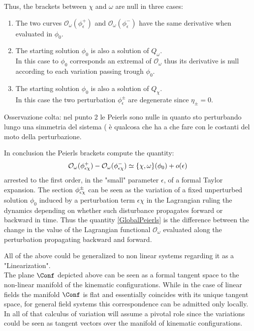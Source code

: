 \documentclass[Main]{subfiles}
\begin{document}
		Thus, the brackets between $\chi$ and $\omega$ are null in three cases:
		\begin{enumerate}
			\item The two curves $\mathcal{O}_\omega ( \phi_\epsilon^+)$ and $\mathcal{O}_\omega ( \phi_\epsilon^-)$ have the same derivative when evaluated in $\phi_0$.
			\item The starting solution $\phi_0$ is also a solution of $Q_\omega$.\\
				In this case to $\phi_0$ corresponds an extremal of $\mathcal{O}_\omega$ thus its derivative is null according to each variation passing trough $\phi_0$.
			\item The starting solution $\phi_0$ is also a solution of $Q_\chi$.\\
				In this case the two perturbation $\phi_\epsilon^\pm$ are degenerate since $ \eta_\pm = 0$.
		\end{enumerate}
		
		\begin{Warning}
			Osservazione colta: nel punto 2 le Peierls sono nulle in quanto sto perturbando lungo una simmetria del sistema ( è qualcosa che ha a che fare con le costanti del moto della perturbazione.
		\end{Warning}
		
		In conclusion the Peierls brackets compute the quantity:
		\begin{equation}\label{GlobalPeierls}
			\mathcal{O}_\omega ( \phi_{\tiny \epsilon\chi}^+)  - \mathcal{O}_\omega ( \phi_{\tiny \epsilon\chi}^-) \simeq  \{\chi, \omega \}(\phi_0)  + o(\epsilon)
		\end{equation}
		arrested to the first order, in the "small" parameter $\epsilon$, of a formal Taylor expansion.
		The section $\phi_{\tiny \epsilon\chi}^\pm$ can be seen as the variation of a fixed unperturbed solution $\phi_0$ induced by a perturbation term $\epsilon \chi$ in the Lagrangian ruling the dynamics depending on whether such disturbance propagates forward or backward in time.
		Thus the  quantity \ref{GlobalPeierls} is the difference between the change in the value of the Lagrangian functional $\mathcal{O}_\omega$ evaluated along  the perturbation propagating backward and forward.
		
		\begin{remark}
		All of the above could be generalized to non linear systems regarding it as a "Linearization".\\
		The plane $\Conf$ depicted above can be seen as a formal tangent space to the non-linear manifold of the kinematic configurations.
		While in the case of linear fields the manifold $\Conf$ is flat and essentially coincides with its unique tangent space, for general field systems  this correspondence can be admitted only locally.
		In all of that calculus of variation will assume a pivotal role since the variations could be seen as tangent vectors over the manifold of  kinematic configurations.
		\end{remark}		
		
\end{document}
